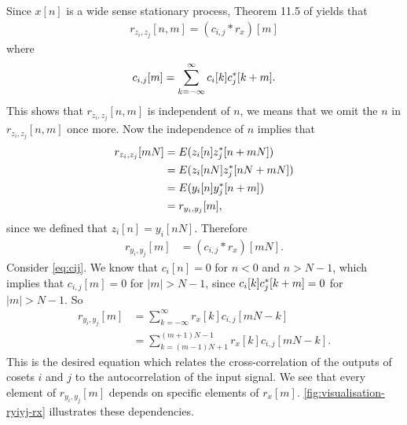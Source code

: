 \documentclass[a4paper, openany, oneside]{memoir}
\begin{document}
Since $x[n]$ is a wide sense stationary process, Theorem 11.5 of \cite{yates2005probability} yields that
\begin{align} \label{eq:crij-rx}
    r_{z_i,z_j}[n,m] = (c_{i,j} \ast r_{x})[m]
\end{align}
where
\begin{align} \label{eq:cij}
    c_{i,j}[m] = \sum_{k=-\infty}^{\infty}c_i[k] c^*_j[k+m].
\end{align}
This shows that $r_{z_i,z_j}[n,m]$ is independent of $n$, we means that we omit the $n$ in $r_{z_i,z_j}[n,m]$  once more. Now the independence of $n$ implies that
\begin{align*}
    r_{z_i,z_j}[mN] &= E(z_i[n]z^*_j[n+mN]) \\
    &= E(z_i[nN]z^*_j[nN+mN]) \\
    &= E(y_i[n]y^*_j[n+m]) \\
    &= r_{y_i,y_j}[m],
\end{align*}
since we defined that $z_i[n]=y_i[nN]$. Therefore
\begin{align*}
    r_{y_i,y_j}[m] &= (c_{i,j}\ast r_{x})[mN].
\end{align*}
Consider \cref{eq:cij}. We know that $c_i[n]=0$ for $n < 0$ and $n > N-1$, which implies that $c_{i,j}[m]=0$ for $|m| > N-1$, since $c_i[k]c^*_j[k+m]=0$ for $|m| > N-1$. So
\begin{align} \label{eq:ryiyj-rx}
    r_{y_i,y_j}[m] &= \sum_{k=-\infty}^{\infty}r_{x}[k]c_{i,j}[mN-k] \nonumber \\
    &= \sum_{k=(m-1)N+1}^{(m+1)N-1}r_{x}[k]c_{i,j}[mN-k].
\end{align}
This is the desired equation which relates the cross-correlation of the outputs of cosets $i$ and $j$ to the autocorrelation of the input signal.
We see that every element of $r_{y_i,y_j}[m]$ depends on specific elements of $r_x[m]$. \cref{fig:visualisation-ryiyj-rx} illustrates these dependencies.
\end{document}
